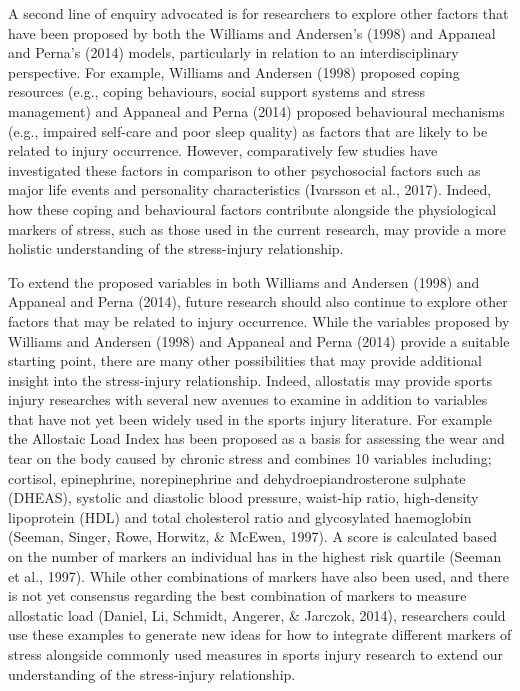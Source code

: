 \documentclass[man,floatsintext]{apa6}
\begin{document}
A second line of enquiry advocated is for researchers to explore other factors that have been proposed by both the Williams and Andersen's (1998) and Appaneal and Perna's (2014) models, particularly in relation to an interdisciplinary perspective.
For example, Williams and Andersen (1998) proposed coping resources (e.g., coping behaviours, social support systems and stress management) and Appaneal and Perna (2014) proposed behavioural mechanisms (e.g., impaired self-care and poor sleep quality) as factors that are likely to be related to injury occurrence.
However, comparatively few studies have investigated these factors in comparison to other psychosocial factors such as major life events and personality characteristics (Ivarsson et al., 2017).
Indeed, how these coping and behavioural factors contribute alongside the physiological markers of stress, such as those used in the current research, may provide a more holistic understanding of the stress-injury relationship.

To extend the proposed variables in both Williams and Andersen (1998) and Appaneal and Perna (2014), future research should also continue to explore other factors that may be related to injury occurrence.
While the variables proposed by Williams and Andersen (1998) and Appaneal and Perna (2014) provide a suitable starting point, there are many other possibilities that may provide additional insight into the stress-injury relationship.
Indeed, allostatis may provide sports injury researches with several new avenues to examine in addition to variables that have not yet been widely used in the sports injury literature.
For example the Allostaic Load Index has been proposed as a basis for assessing the wear and tear on the body caused by chronic stress and combines 10 variables including; cortisol, epinephrine, norepinephrine and dehydroepiandrosterone sulphate (DHEAS), systolic and diastolic blood pressure, waist-hip ratio, high-density lipoprotein (HDL) and total cholesterol ratio and glycosylated haemoglobin (Seeman, Singer, Rowe, Horwitz, \& McEwen, 1997).
A score is calculated based on the number of markers an individual has in the highest risk quartile (Seeman et al., 1997). While other combinations of markers have also been used, and there is not yet consensus regarding the best combination of markers to measure allostatic load (Daniel, Li, Schmidt, Angerer, \& Jarczok, 2014), researchers could use these examples to generate new ideas for how to integrate different markers of stress alongside commonly used measures in sports injury research to extend our understanding of the stress-injury relationship.
\end{document}
